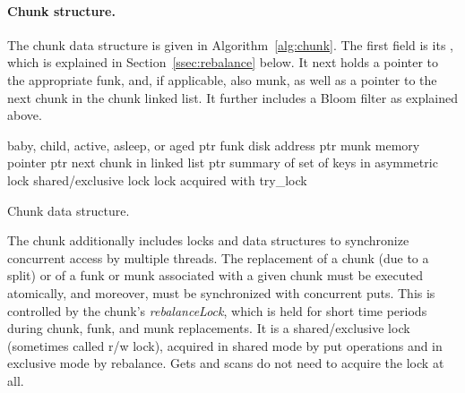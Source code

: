 \paragraph{Chunk structure.}

The chunk data structure is given in Algorithm~\ref{alg:chunk}. 
The first field is its , which is explained in Section~\ref{ssec:rebalance}  below. 
It next holds a pointer to the appropriate funk, and, if applicable, also munk, as well as a pointer to the next 
chunk in the chunk linked list.
It further includes a Bloom filter as explained above.

\begin{algorithm}[htb]

\begin{algorithmic}
\State {} \Comment  baby, child, active, asleep, or aged
\State ptr  \Comment funk disk address
\State ptr  \Comment munk memory pointer
\State ptr  \Comment next chunk in linked list
\State ptr  \Comment summary of set of keys in 
\State asymmetric lock  \Comment shared/exclusive lock 
\State lock  \Comment acquired with try\_lock 
\end{algorithmic}

\caption{Chunk data structure.}
\label{alg:chunk}
\end{algorithm}


The chunk additionally includes locks and data structures to synchronize concurrent access by multiple threads.
The replacement of a chunk (due to a split) or of a funk or munk associated with a given chunk 
must be executed atomically, and moreover, must be synchronized with concurrent puts. 
This is controlled by the chunk's \emph{rebalanceLock}, which is held for short time periods
during chunk, funk, and munk replacements.  It is a shared/exclusive lock (sometimes called r/w lock), acquired in shared mode 
by put operations and in exclusive mode by rebalance. Gets and scans do not need to acquire the lock at all.

